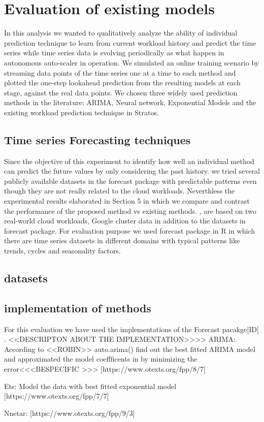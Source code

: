 \section{Evaluation of existing models}

In this analysis we wanted to qualitatively analyze the ability of individual prediction technique to learn from current workload history and predict the time series while time series data is evolving periodically as what happen in autonomous auto-scaler in operation. We simulated an online training scenario by streaming data points of the time series one at a time to each method and plotted the one-step lookahead prediction from the resulting models at each stage, against the real data points. 
We chosen three widely used prediction methods in the literature: ARIMA, Neural network, Exponential Models and the existing workload prediction technique in Stratos.

\subsection{Time series Forecasting techniques}



Since the objective of this experiment to identify how well an individual method can predict the future values by only considering the past history. we tried several publicly available datasets in the forecast package with predictable patterns even though they are not really related to the cloud workloads. Neverthless the experimental results elaborated in Section 5 in which we  compare and contrast the performance of the proposed method vs existing methods. , are based on two real-world cloud workloads, Google cluster data  in addition to the datasets in forecast package. For evaluation purpose we used forecast package in R \cite{forecastPackage} in which there are time series datasets in different domains with typical patterns like trends, cycles and seasonality factors. 

\subsection{datasets}



\subsection{implementation of methods}
For this evaluation we have used the implementations of the Forecast pacakge[ID] . <<DESCRIPTON ABOUT THE IMPLEMENTATION>>>>
ARIMA: According to <<ROBIN>> auto.arima()  find out the best fitted ARIMA model and approximated the model coeffficents in by minimizing the error<<<BESPECIFIC >>> [https://www.otexts.org/fpp/8/7]

Ets: Model the data with best fitted exponential model [https://www.otexts.org/fpp/7/7]

    \cite{Wagner_2011}
	Nnetar: [https://www.otexts.org/fpp/9/3]
